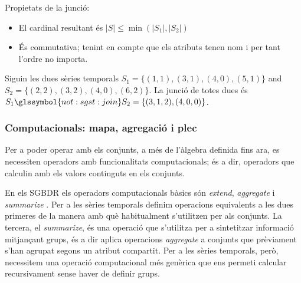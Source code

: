 Propietats de la junció:
\begin{itemize}
\item El cardinal resultant és $|S|\leq\min(|S_1|,|S_2|)$
\item És commutativa; tenint en compte que els atributs tenen nom i
  per tant l'ordre no importa.
\end{itemize}




\begin{example}
  Siguin les dues sèries temporals $S_1=\{(1,1),(3,1),(4,0),(5,1)\}$
  and $S_2=\{(2,2),(3,2),(4,0),(6,2)\}$.  La junció de totes dues és
  $S_1 \glssymbol{not:sgst:join} S_2 = \{(3,1,2),(4,0,0)\}$.
\end{example}



\subsubsection{Computacionals: mapa, agregació i plec}

Per a poder operar amb els conjunts, a més de l'àlgebra definida fins
ara, es necessiten operadors amb funcionalitats computacionals; és a
dir, operadors que calculin amb els valors continguts en els conjunts. 

En els \gls{SGBDR} els operadors computacionals bàsics són
\emph{extend}, \emph{aggregate} i
\emph{summarize} \parencite[cap.~7]{date04:introduction8}.  Per a les
sèries temporals definim operacions equivalents a les dues primeres de
la manera amb què habitualment s'utilitzen per als conjunts.  La
tercera, el \emph{summarize}, és una operació que s'utilitza per a
sintetitzar informació mitjançant grups, és a dir aplica operacions
\emph{aggregate} a conjunts que prèviament s'han agrupat segons un
atribut compartit.  Per a les sèries temporals, però, necessitem una
operació computacional més genèrica que ens permeti calcular
recursivament sense haver de definir grups.




